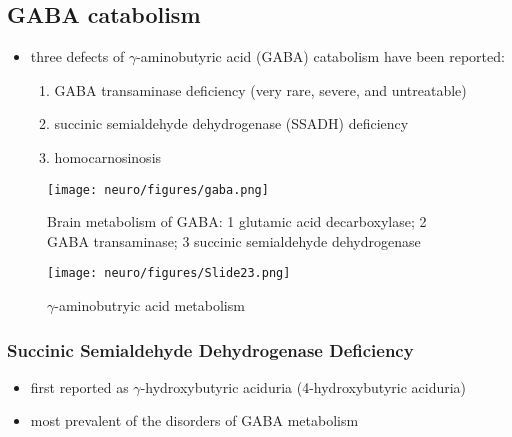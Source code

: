 \documentclass[12pt]{scrartcl}
\begin{document}
\subsection{GABA catabolism}
\label{sec:org7c14896}
\begin{itemize}
\item three defects of \(\gamma\)-aminobutyric acid (GABA) catabolism have been reported:
\begin{enumerate}
\item GABA transaminase deficiency (very rare, severe, and untreatable)
\item succinic semialdehyde dehydrogenase (SSADH) deficiency
\item homocarnosinosis
\end{enumerate}
\end{itemize}

\begin{figure}[htbp]
\centering
\texttt{[image: neuro/figures/gaba.png]}
\caption{\label{fig:org9ff6fbf}Brain metabolism of GABA: 1 glutamic acid decarboxylase; 2 GABA transaminase; 3 succinic semialdehyde dehydrogenase}
\end{figure}

\begin{figure}[htbp]
\centering
\texttt{[image: neuro/figures/Slide23.png]}
\caption{\label{fig:org914d23b}\(\gamma\)-aminobutryic acid metabolism}
\end{figure}

\subsubsection{Succinic Semialdehyde Dehydrogenase Deficiency}
\label{sec:org0e4b1b1}
\begin{itemize}
\item first reported as \(\gamma\)-hydroxybutyric aciduria (4-hydroxybutyric
aciduria)
\item most prevalent of the disorders of GABA metabolism
\end{itemize}
\end{document}
